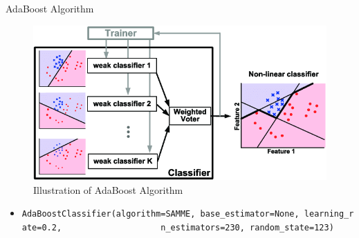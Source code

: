 \documentclass[
  10pt,
  ignorenonframetext,
  fontset=fandol]{beamer}
\providecommand{\tightlist}{%
  \setlength{\itemsep}{0pt}\setlength{\parskip}{0pt}}
\begin{document}
\begin{frame}[fragile]{AdaBoost Algorithm}
\protect\hypertarget{adaboost-algorithm}{}
\begin{figure}

{\centering \includegraphics[width=0.8\linewidth]{images/AdaBoost} 

}

\caption{Illustration of AdaBoost Algorithm}\label{fig:unnamed-chunk-6}
\end{figure}

\begin{itemize}
\tightlist
\item
  \texttt{AdaBoostClassifier(algorithm=\textquotesingle{}SAMME\textquotesingle{},\ base\_estimator=None,\ learning\_rate=0.2,\ \ \ \ \ \ \ \ \ \ \ \ \ \ \ \ \ \ \ \ n\_estimators=230,\ random\_state=123)}
\end{itemize}
\end{frame}
\end{document}
